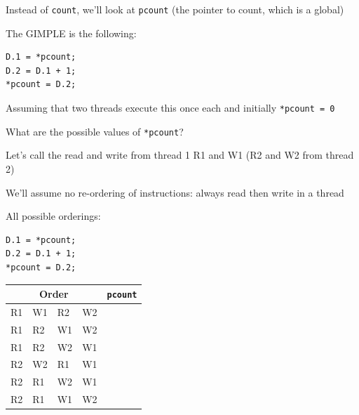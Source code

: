   \begin{slide}


    Instead of \texttt{count}, we'll look at \texttt{pcount} (the pointer to
    count, which is a global)
    \medskip

    The GIMPLE is the following:
    \begin{verbatim}
D.1 = *pcount;
D.2 = D.1 + 1;
*pcount = D.2;
    \end{verbatim}
    \medskip
    
    Assuming that two threads execute this once each
    and initially \texttt{*pcount = 0}

    \leftspace{}What are the possible values of \texttt{*pcount}?

  \end{slide}

  \begin{slide}


    Let's call the read and write from thread 1 R1 and W1 (R2 and W2 from thread 2)
    \medskip

    We'll assume no re-ordering of instructions: always read then write in
    a thread
    \medskip

    All possible orderings:

	\begin{minipage}{0.25\textwidth}
	    \begin{verbatim}
D.1 = *pcount;
D.2 = D.1 + 1;
*pcount = D.2;
		\end{verbatim}
	\end{minipage}
	\hfill
	\begin{minipage}{0.73\textwidth}
		\begin{center}
		  \begin{tabular}{llll|r}
			\multicolumn{4}{c|}{Order} & {\tt *pcount}\\
			\hline
			R1 & W1 & R2 & W2 &  \\
			R1 & R2 & W1 & W2 &  \\
			R1 & R2 & W2 & W1 &  \\
			R2 & W2 & R1 & W1 &  \\
			R2 & R1 & W2 & W1 &  \\
			R2 & R1 & W1 & W2 &  \\
		  \end{tabular}
		\end{center}
	\end{minipage}
	
  \end{slide}

